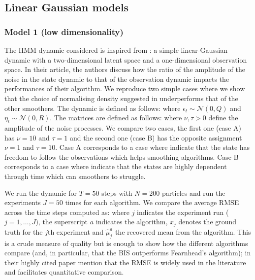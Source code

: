 \subsection{Linear Gaussian models}
\subsubsection{Model 1 (low dimensionality)}
The HMM dynamic considered is inspired from \citep{fearnhead10}: a simple linear-Gaussian dynamic with a two-dimensional latent space and a one-dimensional observation space. In their article, the authors discuss how the ratio of the amplitude of the noise in the state dynamic to that of the observation dynamic impacts the performances of their algorithm. 
We reproduce two simple cases where we show that the choice of normalising density suggested in \citep{briers10,fearnhead10} underperforms that of the other smoothers. 
The dynamic is defined as follows:
%
%
where $\epsilon_{t}\sim \mathcal N(0,Q)$ and $\eta_{t}\sim\mathcal N(0,R)$. The matrices are defined as follows:
%
\renewcommand{\arraystretch}{0.7}
\renewcommand{\arraystretch}{1.2}
%
where $\nu,\tau>0$ define the amplitude of the noise processes. We compare two cases, the first one (case A) has $\nu=10$ and $\tau=1$ and the second one (case B) has the opposite assignment $\nu=1$ and $\tau=10$. Case A corresponds to a case where \citet{fearnhead10} indicate that the state has freedom to follow the observations which helps smoothing algorithms. Case B corresponds to a case where \citet{fearnhead10} indicate that the states are highly dependent through time which can smoothers to struggle. 

We run the dynamic for $T=50$ steps with $N=200$ particles and run the experiments $J=50$ times for each algorithm.
We compare the average RMSE across the time steps computed as:
%
%
where $j$ indicates the experiment run ($j=1,\dots,J$), the superscript $a$ indicates the algorithm, $x_{j}$ denotes the ground truth for the $j$th experiment and $\hat\mu^{a}_{j}$ the recovered mean from the algorithm. 
This is a crude measure of quality but is enough to show how the different algorithms compare (and, in particular, that the BIS outperforms Fearnhead's algorithm); \citet{arulampalam02} in their highly cited paper mention that the RMSE is widely used in the literature and facilitates quantitative comparison.  

